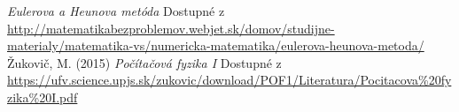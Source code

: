 \documentclass{article}
\theoremstyle{definition}
\theoremstyle{remark}
\begin{document}
\begin{thebibliography}{99}
 \emph{Eulerova a Heunova metóda} Dostupné z \url{http://matematikabezproblemov.webjet.sk/domov/studijne-materialy/matematika-vs/numericka-matematika/eulerova-heunova-metoda/}
Žukovič, M. (2015) \emph{Počítačová fyzika I} Dostupné z \url{https://ufv.science.upjs.sk/zukovic/download/POF1/Literatura/Pocitacova%20fyzika%20I.pdf}
\end{thebibliography}
\end{document}
